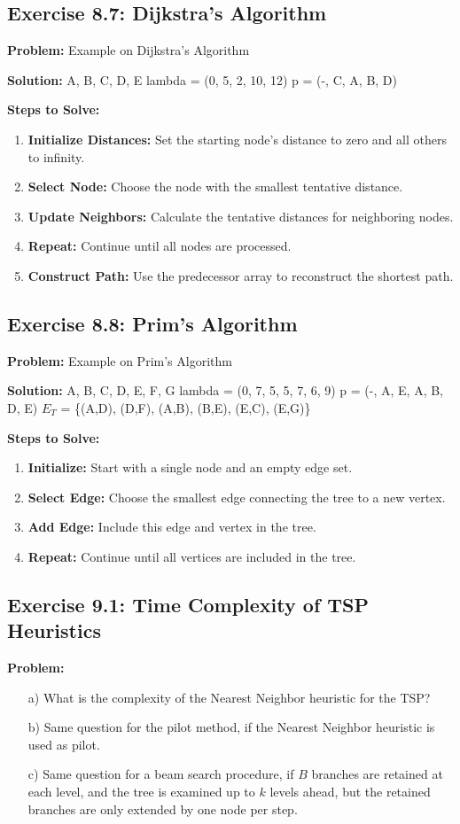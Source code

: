 \subsection{Exercise 8.7: Dijkstra's Algorithm}
\textbf{Problem:} Example on Dijkstra's Algorithm

\textbf{Solution:}
A, B, C, D, E
lambda = (0, 5, 2, 10, 12)
p = (-, C, A, B, D)

\textbf{Steps to Solve:}
\begin{enumerate}
\item \textbf{Initialize Distances:} Set the starting node's distance to zero and all others to infinity.
\item \textbf{Select Node:} Choose the node with the smallest tentative distance.
\item \textbf{Update Neighbors:} Calculate the tentative distances for neighboring nodes.
\item \textbf{Repeat:} Continue until all nodes are processed.
\item \textbf{Construct Path:} Use the predecessor array to reconstruct the shortest path.
\end{enumerate}

\subsection{Exercise 8.8: Prim's Algorithm}
\textbf{Problem:} Example on Prim's Algorithm

\textbf{Solution:}
A, B, C, D, E, F, G
lambda = (0, 7, 5, 5, 7, 6, 9)
p = (-, A, E, A, B, D, E)
$E_T$ = \{(A,D), (D,F), (A,B), (B,E), (E,C), (E,G)\}

\textbf{Steps to Solve:}
\begin{enumerate}
\item \textbf{Initialize:} Start with a single node and an empty edge set.
\item \textbf{Select Edge:} Choose the smallest edge connecting the tree to a new vertex.
\item \textbf{Add Edge:} Include this edge and vertex in the tree.
\item \textbf{Repeat:} Continue until all vertices are included in the tree.
\end{enumerate}

\subsection{Exercise 9.1: Time Complexity of TSP Heuristics}
\textbf{Problem:}
\begin{enumerate}
\item[a)] What is the complexity of the Nearest Neighbor heuristic for the TSP?
\item[b)] Same question for the pilot method, if the Nearest Neighbor heuristic is used as pilot.
\item[c)] Same question for a beam search procedure, if $B$ branches are retained at each level, and the tree is examined up to $k$ levels ahead, but the retained branches are only extended by one node per step.
\end{enumerate}

